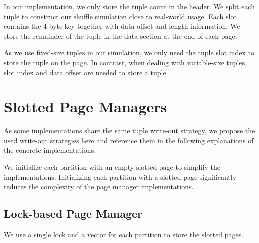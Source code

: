 In our implementation, we only store the tuple count in the header.
We split each tuple to construct our shuffle simulation close to real-world usage.
Each slot contains the 4-byte key together with data offset and length information.
We store the remainder of the tuple in the data section at the end of each page.

As we use fixed-size tuples in our simulation, we only need the tuple slot index to store the tuple on the page.
In contrast, when dealing with variable-size tuples, slot index and data offset are needed to store a tuple.

\section{Slotted Page Managers}\label{section-slotted-page-managers}
As some implementations share the same tuple write-out strategy, we propose the used write-out strategies here and reference them in the following explanations of the concrete implementations.

We initialize each partition with an empty slotted page to simplify the implementations.
Initializing each partition with a slotted page significantly reduces the complexity of the page manager implementations.

\subsection{Lock-based Page Manager}
We use a single lock and a vector for each partition to store the slotted pages.



